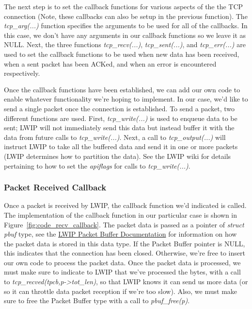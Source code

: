 \documentclass[11pt]{article}
\begin{document}
The next step is to set the callback functions for various aspects of the the TCP connection (Note, these callbacks can also be setup in the previous function). The \textit{tcp\_arg(...)} function specifies the arguments to be used for all of the callbacks. In this case, we don't have any arguments in our callback functions so we leave it as NULL. Next, the three functions \textit{tcp\_recv(...)}, \textit{tcp\_sent(...)}, and \textit{tcp\_err(...)} are used to set the callback functions to be used when new data has been received, when a sent packet has been ACKed, and when an error is encountered respectively.

Once the callback functions have been established, we can add our own code to enable whatever functionality we're hoping to implement. In our case, we'd like to send a single packet once the connection is established. To send a packet, two different functions are used. First, \textit{tcp\_write(...)} is used to enqueue data to be sent; LWIP will not immediately send this data but instead buffer it with the data from future calls to \textit{tcp\_write(...)}. Next, a call to \textit{tcp\_output(...)} will instruct LWIP to take all the buffered data and send it in one or more packets (LWIP determines how to partition the data). See the LWIP wiki for details pertaining to how to set the \textit{apiflags} for calls to \textit{tcp\_write(...)}.

\subsubsection*{Packet Received Callback}
Once a packet is received by LWIP, the callback function we'd indicated is called. The implementation of the callback function in our particular case is shown in Figure~\ref{fig:code_recv_callback}. The packet data is passed as a pointer of \textit{struct pbuf} type, see the \href{http://www.nongnu.org/lwip/2_0_x/group__pbuf.html}{\color{blue}LWIP Packet Buffer Documentation} for information on how the packet data is stored in this data type. If the Packet Buffer pointer is NULL, this indicates that the connection has been closed. Otherwise, we're free to insert our own code to process the packet data. Once the packet data is processed, we must make sure to indicate to LWIP that we've processed the bytes, with a call to \textit{tcp\_recved(tpcb,p->tot\_len)}, so that LWIP knows it can send us more data (or so it can throttle data packet reception if we're too slow). Also, we must make sure to free the Packet Buffer type with a call to \textit{pbuf\_free(p)}.
\end{document}
